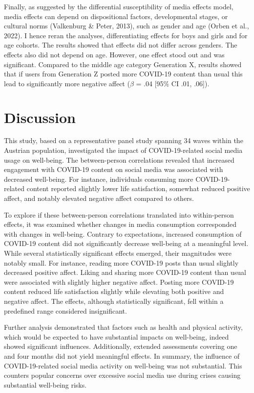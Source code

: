\documentclass[
  man,mask,floatsintext]{apa7}
\begin{document}
Finally, as suggested by the differential susceptibility of media effects model, media effects can depend on dispositional factors, developmental stages, or cultural norms (Valkenburg \& Peter, 2013), such as gender and age (Orben et al., 2022).
I hence reran the analyses, differentiating effects for boys and girls and for age cohorts.
The results showed that effects did not differ across genders.
The effects also did not depend on age.
However, one effect stood out and was significant.
Compared to the middle age category Generation X, results showed that if users from Generation Z posted more COVID-19 content than usual this lead to significantly more negative affect (\(\beta\) = .04 {[}95\% CI .01, .06{]}).

\hypertarget{discussion}{%
\section{Discussion}\label{discussion}}

This study, based on a representative panel study spanning 34 waves within the Austrian population, investigated the impact of COVID-19-related social media usage on well-being. The between-person correlations revealed that increased engagement with COVID-19 content on social media was associated with decreased well-being. For instance, individuals consuming more COVID-19-related content reported slightly lower life satisfaction, somewhat reduced positive affect, and notably elevated negative affect compared to others.

To explore if these between-person correlations translated into within-person effects, it was examined whether changes in media consumption corresponded with changes in well-being. Contrary to expectations, increased consumption of COVID-19 content did not significantly decrease well-being at a meaningful level. While several statistically significant effects emerged, their magnitudes were notably small. For instance, reading more COVID-19 posts than usual slightly decreased positive affect. Liking and sharing more COVID-19 content than usual were associated with slightly higher negative affect. Posting more COVID-19 content reduced life satisfaction slightly while elevating both positive and negative affect. The effects, although statistically significant, fell within a predefined range considered insignificant.

Further analysis demonstrated that factors such as health and physical activity, which would be expected to have substantial impacts on well-being, indeed showed significant influences. Additionally, extended assessments covering one and four months did not yield meaningful effects. In summary, the influence of COVID-19-related social media activity on well-being was not substantial. This counters popular concerns over excessive social media use during crises causing substantial well-being risks.
\end{document}
